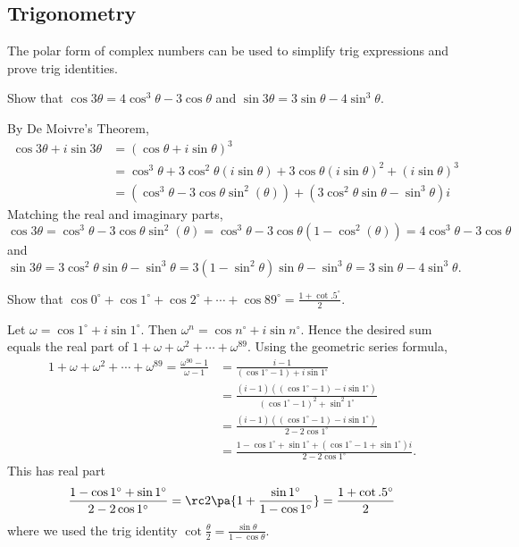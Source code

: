 \subsection{Trigonometry}
The polar form of complex numbers can be used to simplify trig expressions and prove trig identities. 
\begin{ex}
Show that $\cos3\theta=4\cos^3\theta-3\cos \theta$ and $\sin 3\theta =3\sin\theta-4\sin^3\theta$.
\end{ex}
 By De Moivre's Theorem,
\begin{align*}
\cos3\theta+i\sin 3\theta&=
(\cos \theta+i\sin \theta)^3\\
&=
\cos^3 \theta +3\cos^2\theta (i\sin \theta) +3\cos \theta(i\sin \theta)^2+(i\sin\theta)^3\\
&=(\cos^3\theta-3\cos\theta\sin^2(\theta))+(3\cos^2\theta\sin\theta- \sin^3\theta)i
\end{align*}
Matching the real and imaginary parts,
\[\cos3\theta =\cos^3\theta-3\cos\theta\sin^2(\theta)
=\cos^3\theta-3\cos\theta(1-\cos^2(\theta))
=4\cos^3\theta-3\cos\theta\]
and
\[
\sin 3\theta =3\cos^2\theta\sin\theta- \sin^3\theta
=3(1-\sin^2\theta)\sin\theta-\sin^3\theta
=3\sin \theta-4\sin^3\theta.
\]
\begin{ex}
Show that $\cos 0^{\circ}+\cos 1^{\circ}+\cos 2^{\circ} +\cdots +\cos 89^{\circ}=\frac{1+\cot .5^{\circ}}{2}$.
\end{ex}
 Let $\omega=\cos1^{\circ}+i\sin 1^{\circ}$. Then $\omega^n=\cos n^{\circ}+i\sin n^{\circ}$. Hence the desired sum equals the real part of $1+\omega+\omega^2+\cdots +\omega^{89}$. Using the geometric series formula,
\begin{align*}
1+\omega+\omega^2+\cdots +\omega^{89}=\frac{\omega^{90}-1}{\omega-1}&=\frac{i-1}{(\cos 1^{\circ}-1)+i\sin 1^{\circ}}\\
&=\frac{(i-1)((\cos 1^{\circ}-1)-i\sin 1^{\circ})}{(\cos 1^{\circ}-1)^2+\sin^2 1^{\circ}}\\
&=\frac{(i-1)((\cos 1^{\circ}-1)-i\sin 1^{\circ})}{2-2\cos1^{\circ}}\\
&=\frac{1-\cos1^{\circ}+\sin1^{\circ}+(\cos1^{\circ}-1+\sin1^{\circ})i}{2-2\cos 1^{\circ}}.
\end{align*}
This has real part
\[
\frac{1-\cos1^{\circ}+\sin1^{\circ}}{2-2\cos 1^{\circ}}=
\rc2\pa{1+\frac{\sin 1^{\circ}}{1-\cos 1^{\circ}}}=\frac{1+\cot .5^{\circ}}{2}
\]
where we used the trig identity $\cot \frac{\theta}{2}=\frac{\sin\theta}{1-\cos\theta}$.

